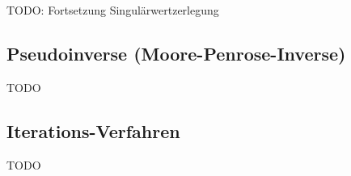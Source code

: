 TODO: Fortsetzung Singulärwertzerlegung

\subsection{Pseudoinverse (Moore-Penrose-Inverse)}

TODO

\subsection{Iterations-Verfahren}


TODO
